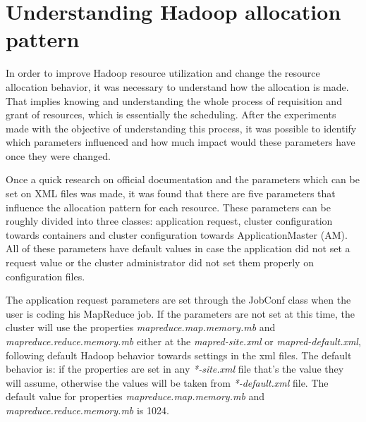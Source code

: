 
\section{Understanding Hadoop allocation pattern}
\label{sec:alloc}
In order to improve Hadoop resource utilization and change the resource allocation behavior, it was necessary to understand how the allocation is made. That implies knowing and understanding the whole process of requisition and grant of resources, which is essentially the scheduling. After the experiments made with the objective of understanding this process, it was possible to identify which parameters influenced and how much impact would these parameters have once they were changed.

Once a quick research on official documentation and the parameters which can be set on XML files was made, it was found that there are five parameters that influence the allocation pattern for each resource. These parameters can be roughly divided into three classes: application request, cluster configuration towards containers and cluster configuration towards ApplicationMaster (AM). All of these parameters have default values in case the application did not set a request value or the cluster administrator did not set them properly on configuration files.

The application request parameters are set through the JobConf class when the user is coding his MapReduce job. If the parameters are not set at this time, the cluster will use the properties \textit{mapreduce.map.memory.mb} and \textit{mapreduce.reduce.memory.mb} either at the \textit{mapred-site.xml} or \textit{mapred-default.xml}, following default Hadoop behavior towards settings in the xml files. The default behavior is: if the properties are set in any \textit{*-site.xml} file that's the value they will assume, otherwise the values will be taken from \textit{*-default.xml} file.
The default value for properties \textit{mapreduce.map.memory.mb} and \textit{mapreduce.reduce.memory.mb} is 1024.

